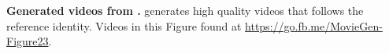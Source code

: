 
\begin{center}
    \centering
    \captionsetup{type=figure}
    
    \vspace{-3mm}
    \caption{\textbf{Generated videos from \OursPTV.} 
    \OursPTV generates high quality videos that follows the reference identity. Videos in this Figure found at \url{https://go.fb.me/MovieGen-Figure23}.}
    \label{fig:pt2v_qual_ours_figure}
\end{center}%
